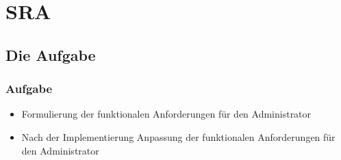 \section{SRA}
\subsection{Die Aufgabe}
\begin{frame} %
  \frametitle{Aufgabe} %
 \begin{itemize}

\item Formulierung der funktionalen Anforderungen für den Administrator
\\
\item Nach der Implementierung Anpassung der funktionalen Anforderungen für den Administrator
 \end{itemize}

\end{frame}

